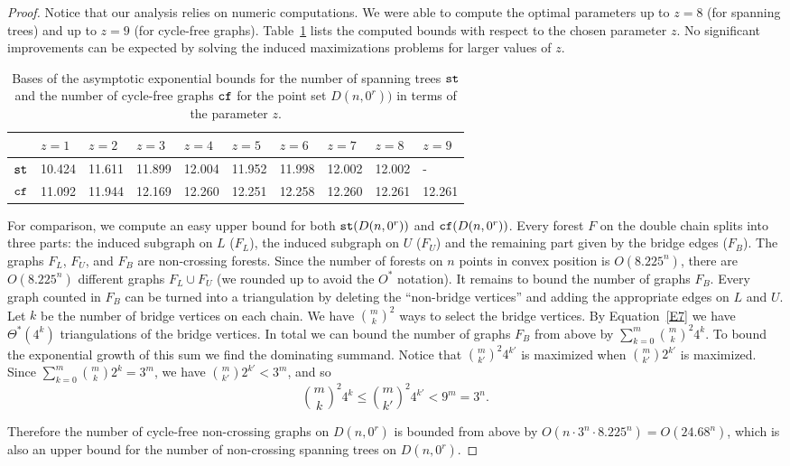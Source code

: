 \documentclass[11pt]{article}
\def\st{{\tt st}}
\def\cf{{\tt cf}}
\begin{document}
\begin{proof}
Notice that our analysis relies on numeric computations. We were able
to compute the optimal parameters up to $z=8$ (for spanning trees) and up
to $z=9$ (for cycle-free graphs). Table~\ref{tab:zz} lists the computed
bounds with respect to the chosen parameter $z$. No significant
improvements can be expected by solving the induced maximizations
problems for larger values of $z$.
\begin{table}
\centering
\begin{tabular}{l||lllllllll}
  & $z=1$ & $z=2$ & $z=3$ & $z=4$ & $z=5$ & $z=6$ & $z=7$ & $z=8$ & $z=9$ \\
  \hline
\hline
 $\st$ & 10.424 & 11.611 & 11.899 & 12.004 & 11.952 & 11.998 & 12.002 & 12.002 & - \\
 $\cf$ &  11.092 & 11.944 & 12.169 & 12.260 & 12.251 & 12.258 & 12.260 & 12.261 & 12.261 \\
 \end{tabular}
\caption{Bases of the asymptotic exponential bounds for the
  number of spanning trees $\st$ and the number of cycle-free graphs
  $\cf$ for the point set  $D(n,0^r))$ in terms of the parameter $z$.}
\label{tab:zz}
\end{table}

For comparison, we compute an easy upper bound for both
$\st(D(n,0^r))$ and $\cf(D(n,0^r))$.
Every forest $F$ on the double chain splits into three parts: the
induced subgraph on $L$ ($F_L$),
the induced subgraph on $U$ ($F_U$) and the remaining part given by
the bridge edges ($F_B$). The graphs $F_L$, $F_U$, and $F_B$ are
non-crossing forests.
Since the number of forests on $n$ points in convex position is
$O(8.225^n)$, there are $O(8.225^n)$ different graphs $F_L \cup F_U$
(we rounded up to avoid the $O^*$ notation).
It remains to bound the number of graphs $F_B$. Every graph counted in
$F_B$ can be turned into a triangulation by deleting the ``non-bridge
vertices'' and adding the appropriate edges on $L$ and $U$. Let $k$ be
the number of bridge vertices on each chain. We have ${m \choose k}^2$
ways to select the bridge vertices. By Equation~\eqref{E7} we have
$\Theta^*(4^{k})$ triangulations of the bridge vertices. In total we
can bound the number of graphs $F_B$ from above by
 $\sum_{k=0}^m { m \choose k }^2 4^k.$
To bound the exponential growth of this sum we find the dominating
summand. Notice that ${ m \choose k' }^2 4^{k'}$ is maximized when
${ m \choose k' } 2^{k'}$ is maximized.
Since $\sum_{k=0}^m { m \choose k } 2^k=3^m$, we have $ { m \choose k' } 2^{k'}<3^m$,
and so
\[{ m \choose k }^2 4^{k} \leq { m \choose k' }^2 4^{k'}<9^m=3^n.\]

Therefore the number of cycle-free non-crossing graphs on $D(n,0^r)$ is
bounded from above by
$O( n \cdot 3^n \cdot 8.225^n)=O(24.68^n)$,
which is also an upper bound for the number of non-crossing spanning
trees on $D(n,0^r)$.
\end{proof}
\end{document}
